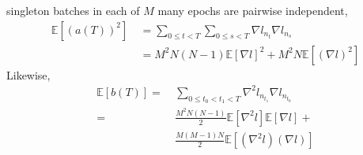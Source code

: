 \documentclass{article}
\theoremstyle{plain}
\theoremstyle{definition}
\newcommand{\expct}[1]{\mathbb{E}\left[#1\right]}
\begin{document}
\begin{shaded}
            singleton batches in each of $M$ many epochs are pairwise
            independent,
            \begin{align*}
                \expct{(a(T))^2}
                ~&=
                \sum_{0\leq t<T} \sum_{0\leq s<T} \nabla l_{n_t} \nabla l_{n_s} \\
                ~&= 
                M^2N(N-1)   \expct{\nabla l}^2 +
                M^2N        \expct{(\nabla l)^2}
            \end{align*}
            Likewise, 
            \begin{align*}
                \expct{b(T)}
                = 
                ~&\sum_{0\leq t_0 < t_1 < T} \nabla^2 l_{n_{t_1}} \nabla l_{n_{t_0}} \\
                =
                ~&\frac{M^2N(N-1)}{2} \expct{\nabla^2 l} \expct{\nabla l} + \\
                ~&\frac{M(M-1)N}{2}  \expct{(\nabla^2 l) (\nabla l)} 
            \end{align*}


\end{shaded}
\end{document}
